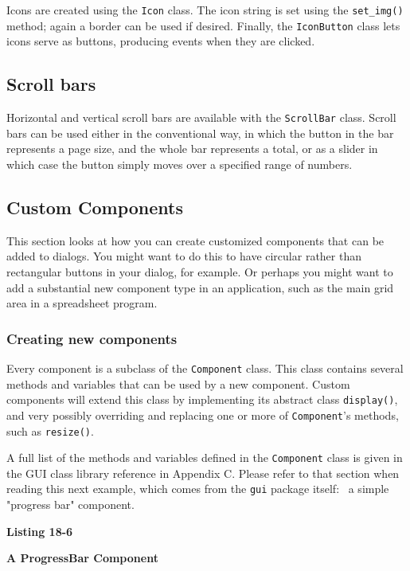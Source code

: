 Icons are created using the \texttt{Icon} class. The icon string is set
using the \texttt{set\_img()} method; again a border can be used if
desired. Finally, the \texttt{IconButton} class lets icons serve as
buttons, producing events when they are clicked.

\subsection{Scroll bars}

Horizontal and vertical scroll bars are available with the
\texttt{ScrollBar} class. Scroll bars can be used either in the
conventional way, in which the button in the bar represents a page
size, and the whole bar represents a total, or as a slider in which
case the button simply moves over a specified range of numbers.

\subsection{Custom Components}

This section looks at how you can create customized components that can
be added to dialogs. You might want to do this to have circular rather
than rectangular buttons in your dialog, for example. Or perhaps you
might want to add a substantial new component type in an application,
such as the main grid area in a spreadsheet program.

\subsubsection*{Creating new components}

Every component is a subclass of the \texttt{Component}
class. This class contains several methods and variables that can be
used by a new component. Custom components will extend this class by
implementing its abstract class \texttt{display()}, and very possibly
overriding and replacing one or more of
\texttt{Component}'s methods, such as
\texttt{resize()}.

A full list of the methods and variables defined in the
\texttt{Component} class is given in the GUI class library reference in
Appendix C. Please refer to that section when reading this next
example, which comes from the \texttt{gui} package itself: \ a simple
"progress bar" component.

{\sffamily\bfseries
Listing 18-6}

{\sffamily\bfseries
A ProgressBar Component}

